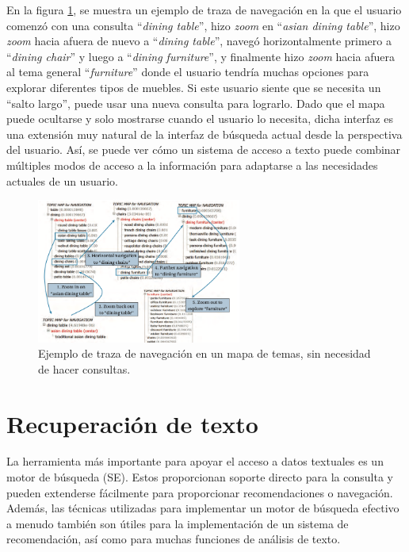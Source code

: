 En la figura \ref{fig:5.3}, se muestra un ejemplo de traza de navegación en la que el usuario comenzó con una consulta ``\textit{dining table}'', hizo \textit{zoom} en ``\textit{asian dining table}'', hizo \textit{zoom} hacia afuera de nuevo a ``\textit{dining table}'', navegó horizontalmente primero a ``\textit{dining chair}'' y luego a ``\textit{dining furniture}'', y finalmente hizo \textit{zoom} hacia afuera al tema general ``\textit{furniture}'' donde el usuario tendría muchas opciones para explorar diferentes tipos de muebles. Si este usuario siente que se necesita un ``salto largo'', puede usar una nueva consulta para lograrlo. Dado que el mapa puede ocultarse y solo mostrarse cuando el usuario lo necesita, dicha interfaz es una extensión muy natural de la interfaz de búsqueda actual desde la perspectiva del usuario. Así, se puede ver cómo un sistema de acceso a texto puede combinar múltiples modos de acceso a la información para adaptarse a las necesidades actuales de un usuario.

\begin{figure}[h]
\centering
\includegraphics[width=0.6\textwidth]{fotos/14.png}
\caption{Ejemplo de traza de navegación en un mapa de temas, sin necesidad de hacer consultas.}
\label{fig:5.3}
\end{figure}

\section{Recuperación de texto}

La herramienta más importante para apoyar el acceso a datos textuales es un motor de búsqueda (SE). Estos proporcionan soporte directo para la consulta y pueden extenderse fácilmente para proporcionar recomendaciones o navegación. Además, las técnicas utilizadas para implementar un motor de búsqueda efectivo a menudo también son útiles para la implementación de un sistema de recomendación, así como para muchas funciones de análisis de texto. \\

